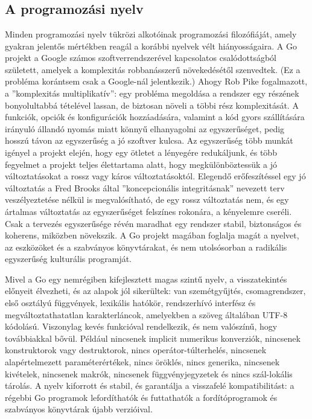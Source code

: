 \chapter{\golang}
\section{A programozási nyelv}
Minden programozási nyelv tükrözi alkotóinak programozási filozófiáját, amely gyakran jelentős mértékben reagál a korábbi nyelvek vélt hiányosságaira.
A Go projekt a Google számos szoftverrendszerével kapcsolatos csalódottságból született, amelyek a komplexitás robbanásszerű növekedésétől szenvedtek.
(Ez a probléma korántsem csak a Google-nál jelentkezik.)
Ahogy Rob Pike fogalmazott, a ''komplexitás multiplikatív'': egy probléma megoldása a rendszer egy részének bonyolultabbá tételével lassan, de biztosan növeli a többi rész komplexitását.
A funkciók, opciók és konfigurációk hozzáadására, valamint a kód gyors szállítására irányuló állandó nyomás miatt könnyű elhanyagolni az egyszerűséget, pedig hosszú távon az egyszerűség a jó szoftver kulcsa.
Az egyszerűség több munkát igényel a projekt elején, hogy egy ötletet a lényegére redukáljunk, és több fegyelmet a projekt teljes élettartama alatt, hogy megkülönböztessük a jó változtatásokat a rossz vagy káros változtatásoktól.
Elegendő erőfeszítéssel egy jó változtatás a Fred Brooks által ''koncepcionális integritásnak'' nevezett terv veszélyeztetése nélkül is megvalósítható, de egy rossz változtatás nem, és egy ártalmas változtatás az egyszerűséget felszínes rokonára, a kényelemre cseréli.
Csak a tervezés egyszerűsége révén maradhat egy rendszer stabil, biztonságos és koherens, miközben növekszik.
A Go projekt magában foglalja magát a nyelvet, az eszközöket és a szabványos könyvtárakat, és nem utolsósorban a radikális egyszerűség kulturális programját.

Mivel a Go egy nemrégiben kifejlesztett magas szintű nyelv, a visszatekintés előnyeit élvezheti, és az alapok jól sikerültek: van szemétgyűjtés, csomagrendszer, első osztályú függvények, lexikális hatókör, rendszerhívó interfész és megváltoztathatatlan karakterláncok, amelyekben a szöveg általában UTF-8 kódolású.
Viszonylag kevés funkcióval rendelkezik, és nem valószínű, hogy továbbiakkal bővül. Például nincsenek implicit numerikus konverziók, nincsenek konstruktorok vagy destruktorok, nincs operátor-túlterhelés, nincsenek alapértelmezett paraméterértékek, nincs öröklés, nincs generika, nincsenek kivételek, nincsenek makrók, nincsenek függvényjegyzetek és nincs szál-lokális tárolás.
A nyelv kiforrott és stabil, és garantálja a visszafelé kompatibilitást: a régebbi Go programok lefordíthatók és futtathatók a fordítóprogramok és szabványos könyvtárak újabb verzióival.

